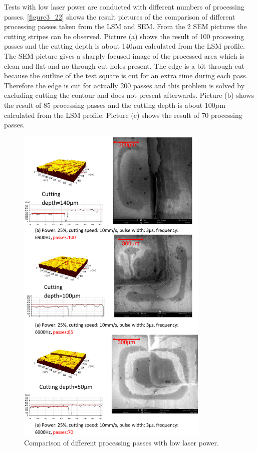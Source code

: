 Tests with low laser power are conducted with different numbers of processing passes. \autoref{figure3_22} shows the result pictures of the comparison of different processing passes taken from the LSM and SEM. From the 2 SEM pictures the cutting stripes can be observed. Picture (a) shows the result of 100 processing passes and the cutting depth is about 140$\mu$m calculated from the LSM profile. The SEM picture gives a sharply focused image of the processed area which is clean and flat and no through-cut holes present. The edge is a bit through-cut because the outline of the test square is cut for an extra time during each pass. Therefore the edge is cut for actually 200 passes and this problem is solved by excluding cutting the contour and does not present afterwards. Picture (b) shows the result of 85 processing passes and the cutting depth is about 100$\mu$m calculated from the LSM profile. Picture (c) shows the result of 70 processing passes.\\
\clearpage

\begin{figure}[!h]%
\centering
\includegraphics[width=0.82\textwidth]{figures/designandfabrication/figure3_22}%
\caption{Comparison of different processing passes with low laser power.}%
\label{figure3_22}%
\end{figure}

